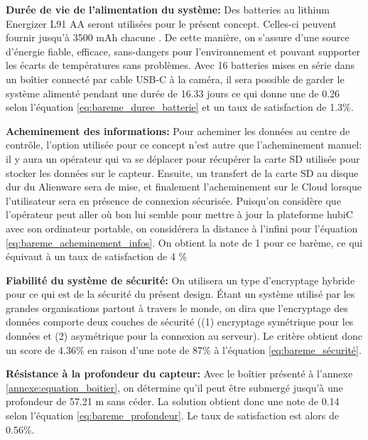 \textbf{Durée de vie de l’alimentation du système:}
Des batteries au lithium Energizer L91 AA seront utilisées pour le présent concept. Celles-ci peuvent fournir jusqu'à 3500 mAh chacune \cite{Energizer}. De cette manière, on s’assure d’une source d’énergie fiable, efficace, sans-dangers pour l’environnement et pouvant supporter les écarts de températures sans problèmes. Avec 16 batteries mises en série dans un boîtier connecté par cable USB-C à la caméra, il sera possible de garder le système alimenté pendant une durée de 16.33 jours ce qui donne une de 0.26 selon l'équation \ref{eq:bareme_duree_batterie} et un taux de satisfaction de 1.3\%.
\vspace{5mm}


\textbf{Acheminement des informations:} Pour acheminer les données au centre de contrôle, l’option utilisée pour ce concept n’est autre que l’acheminement manuel: il y aura un opérateur qui va se déplacer pour récupérer la carte SD utilisée pour stocker les données sur le capteur. Ensuite, un transfert de la carte SD au disque dur du Alienware sera de mise, et finalement l'acheminement sur le Cloud lorsque l'utilisateur sera en présence de connexion sécurisée. Puisqu'on considère que l'opérateur peut aller où bon lui semble pour mettre à jour la plateforme hubiC avec son ordinateur portable, on considérera la distance à l'infini pour l'équation \ref{eq:bareme_acheminement_infos}. On obtient la note de 1 pour ce barème, ce qui équivaut à un taux de satisfaction de 4 \%
\vspace{5mm}

\textbf{Fiabilité du système de sécurité:}
On utilisera un type d’encryptage hybride pour ce qui est de la sécurité du présent design. Étant un système utilisé par les grandes organisations partout à travers le monde, on dira que l’encryptage des données comporte deux couches de sécurité ((1) encryptage symétrique pour les données et (2) asymétrique pour la connexion au serveur). Le critère obtient donc un score de 4.36\% en raison d'une note de 87\% à l'équation \ref{eq:bareme_sécurité}.
\vspace{5mm}


\textbf{Résistance à la profondeur du capteur:} Avec le boîtier présenté à l'annexe \ref{annexe:equation_boitier}, on détermine qu'il peut être submergé jusqu'à une profondeur de 57.21 m sans céder. La solution obtient donc une note de 0.14 selon l'équation \ref{eq:bareme_profondeur}. Le taux de satisfaction est alors de 0.56\%.
\vspace{5mm}

